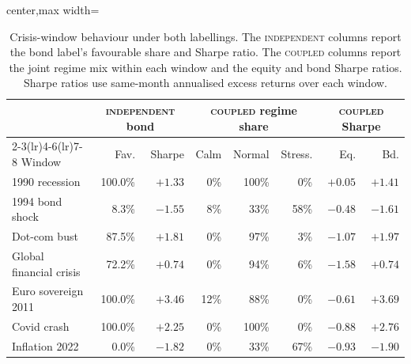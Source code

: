 ﻿\documentclass[10pt]{article}
\newcommand{\Acoup}{\textsc{coupled}}
\newcommand{\Bindep}{\textsc{independent}}
\begin{document}
\begin{table}[H]
    \centering
    \caption{Crisis-window behaviour under both labellings. The \Bindep{} columns report the bond
        label's favourable share and Sharpe ratio. The \Acoup{} columns report the joint regime mix
        within each window and the equity and bond Sharpe ratios. Sharpe ratios use same-month
        annualised excess returns over each window.}
    \label{tab:crisis}
    \small
    \begin{adjustbox}{center,max width=\textwidth}
        \begin{tabular}{lrrrrrrr}
            \toprule
                                    & \multicolumn{2}{c}{\Bindep{} bond} & \multicolumn{3}{c}{\Acoup{} regime share} & \multicolumn{2}{c}{\Acoup{} Sharpe}                                               \\
            \cmidrule(lr){2-3}\cmidrule(lr){4-6}\cmidrule(lr){7-8}
            Window                  & Fav.                               & Sharpe                                    & Calm                                & Normal & Stress.        & Eq.     & Bd.     \\
            \midrule
            1990 recession          & 100.0\%                            & $+1.33$                                   & 0\%                                 & 100\%  & \phantom{0}0\% & $+0.05$ & $+1.41$ \\
            1994 bond shock         & \phantom{0}8.3\%                   & $-1.55$                                   & 8\%                                 & 33\%   & 58\%           & $-0.48$ & $-1.61$ \\
            Dot-com bust            & 87.5\%                             & $+1.81$                                   & 0\%                                 & 97\%   & \phantom{0}3\% & $-1.07$ & $+1.97$ \\
            Global financial crisis & 72.2\%                             & $+0.74$                                   & 0\%                                 & 94\%   & \phantom{0}6\% & $-1.58$ & $+0.74$ \\
            Euro sovereign 2011     & 100.0\%                            & $+3.46$                                   & 12\%                                & 88\%   & \phantom{0}0\% & $-0.61$ & $+3.69$ \\
            Covid crash             & 100.0\%                            & $+2.25$                                   & 0\%                                 & 100\%  & \phantom{0}0\% & $-0.88$ & $+2.76$ \\
            Inflation 2022          & \phantom{0}0.0\%                   & $-1.82$                                   & 0\%                                 & 33\%   & 67\%           & $-0.93$ & $-1.90$ \\
            \bottomrule
        \end{tabular}
    \end{adjustbox}
\end{table}
\end{document}
